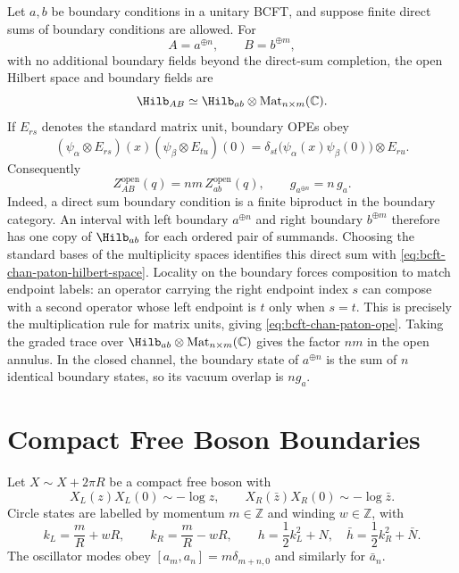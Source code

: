 \begin{remark}
\label{rem:bcft-direct-sum-chan-paton}
Let \(a,b\) be boundary conditions in a unitary BCFT, and suppose finite
direct sums of boundary conditions are allowed.  For
\[
  A=a^{\oplus n},\qquad B=b^{\oplus m},
\]
with no additional boundary fields beyond the direct-sum completion, the
open Hilbert space and boundary fields are
\begin{equation}
  \Hilb_{AB}
  \simeq
  \Hilb_{ab}\otimes \operatorname{Mat}_{n\times m}(\mathbb C).
  \label{eq:bcft-chan-paton-hilbert-space}
\end{equation}
If \(E_{rs}\) denotes the standard matrix unit, boundary OPEs obey
\begin{equation}
  (\psi_\alpha\otimes E_{rs})(x)
  (\psi_\beta\otimes E_{tu})(0)
  =
  \delta_{st}
  \bigl(\psi_\alpha(x)\psi_\beta(0)\bigr)\otimes E_{ru}.
  \label{eq:bcft-chan-paton-ope}
\end{equation}
Consequently
\begin{equation}
  Z_{A B}^{\mathrm{open}}(q)=nm\,Z_{ab}^{\mathrm{open}}(q),
  \qquad
  g_{a^{\oplus n}}=n\,g_a .
  \label{eq:bcft-chan-paton-annulus-g}
\end{equation}
Indeed, a direct sum boundary condition is a finite biproduct in the boundary
category.  An interval with left boundary \(a^{\oplus n}\) and right boundary
\(b^{\oplus m}\) therefore has one copy of \(\Hilb_{ab}\) for each ordered pair
of summands.  Choosing the standard bases of the multiplicity spaces identifies
this direct sum with \eqref{eq:bcft-chan-paton-hilbert-space}.  Locality on the
boundary forces composition to match endpoint labels: an operator carrying the
right endpoint index \(s\) can compose with a second operator whose left
endpoint is \(t\) only when \(s=t\).  This is precisely the multiplication rule
for matrix units, giving \eqref{eq:bcft-chan-paton-ope}.  Taking the graded
trace over \(\Hilb_{ab}\otimes\operatorname{Mat}_{n\times m}(\mathbb C)\) gives
the factor \(nm\) in the open annulus.  In the closed channel, the boundary
state of \(a^{\oplus n}\) is the sum of \(n\) identical boundary states, so its
vacuum overlap is \(n g_a\).
\end{remark}

\section{Compact Free Boson Boundaries}

Let \(X\sim X+2\pi R\) be a compact free boson with
\[
  X_L(z)X_L(0)\sim-\log z,
  \qquad
  X_R(\bar z)X_R(0)\sim-\log\bar z .
\]
Circle states are labelled by momentum \(m\in\mathbb Z\) and winding
\(w\in\mathbb Z\), with
\begin{equation}
  k_L=\frac mR+wR,
  \qquad
  k_R=\frac mR-wR,
  \qquad
  h=\frac12k_L^2+N,\quad
  \bar h=\frac12k_R^2+\bar N .
  \label{eq:compact-boson-momenta-bcft}
\end{equation}
The oscillator modes obey
\([a_m,a_n]=m\delta_{m+n,0}\) and similarly for \(\bar a_n\).

